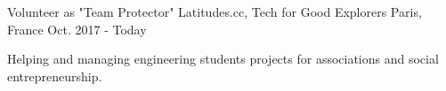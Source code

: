 \begin{cventries}
  \cventry
    {Volunteer as "Team Protector"}
    {Latitudes.cc, Tech for Good Explorers}
    {Paris, France}
    {Oct. 2017 - Today}
    {
      \begin{cvitems}
        \item {Helping and managing engineering students projects for associations and social entrepreneurship.}
      \end{cvitems}
    }
\end{cventries}
